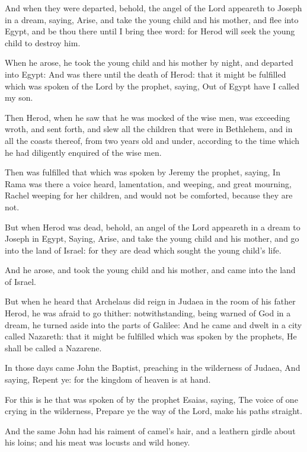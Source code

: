 \Verse And when they were departed, behold, the angel of the Lord appeareth to Joseph in a dream, saying, Arise, and take the young child and his mother, and flee into Egypt, and be thou there until I bring thee word: for Herod will seek the young child to destroy him.

\Verse When he arose, he took the young child and his mother by night, and departed into Egypt: \Verse And was there until the death of Herod: that it might be fulfilled which was spoken of the Lord by the prophet, saying, Out of Egypt have I called my son.

\Verse Then Herod, when he saw that he was mocked of the wise men, was exceeding wroth, and sent forth, and slew all the children that were in Bethlehem, and in all the coasts thereof, from two years old and under, according to the time which he had diligently enquired of the wise men.

\Verse Then was fulfilled that which was spoken by Jeremy the prophet, saying, \Verse In Rama was there a voice heard, lamentation, and weeping, and great mourning, Rachel weeping for her children, and would not be comforted, because they are not.

\Verse But when Herod was dead, behold, an angel of the Lord appeareth in a dream to Joseph in Egypt, \Verse Saying, Arise, and take the young child and his mother, and go into the land of Israel: for they are dead which sought the young child's life.

\Verse And he arose, and took the young child and his mother, and came into the land of Israel.

\Verse But when he heard that Archelaus did reign in Judaea in the room of his father Herod, he was afraid to go thither: notwithstanding, being warned of God in a dream, he turned aside into the parts of Galilee: \Verse And he came and dwelt in a city called Nazareth: that it might be fulfilled which was spoken by the prophets, He shall be called a Nazarene.


\Chapter
\Verse In those days came John the Baptist, preaching in the wilderness of Judaea, \Verse And saying, Repent ye: for the kingdom of heaven is at hand.

\Verse For this is he that was spoken of by the prophet Esaias, saying, The voice of one crying in the wilderness, Prepare ye the way of the Lord, make his paths straight.

\Verse And the same John had his raiment of camel's hair, and a leathern girdle about his loins; and his meat was locusts and wild honey.

